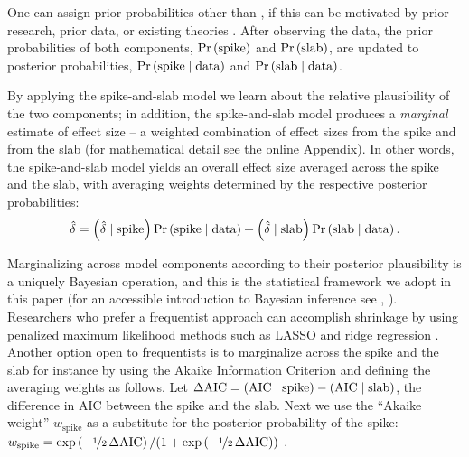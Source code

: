 \documentclass[a4paper]{article}
\newcommand{\shypo}[1]{%
	\ifnum#1>0%
		\mathrm{slab}
	\else%
		\mathrm{spike}
	\fi%
}
\newcommand{\data}{\mathrm{data}}%
\newcommand{\obsDelta}{\hat{\delta}}
\newcommand{\probo}{\mathrm{Pr}}
\newcommand{\prob}[1]{\probo\left(#1\right)}
\newcommand{\AIC}{\mathrm{AIC}}
\newcommand{\DeltaAIC}{\Delta\AIC}
\newenvironment{revision}{\color{teal}}{\color{black}}
\begin{document}
\begin{revision}%
One can assign prior probabilities other than , if this can be motivated by prior research, prior data, or existing theories \parencite[e.g., ][]{wilson2018prior}.
After observing the data, the prior probabilities of both components, $\prob{\shypo{0}}$ and $\prob{\shypo{1}}$, are updated to posterior probabilities, $\prob{\shypo{0}\mid\data}$ and $\prob{\shypo{1}\mid\data}$.

By applying the spike-and-slab model we learn about the relative plausibility of the two components; in addition, the spike-and-slab model produces a \emph{marginal} estimate of effect size -- a weighted combination of effect sizes from the spike and from the slab (for mathematical detail see the online Appendix). In other words, the spike-and-slab model yields an overall effect size averaged across the spike and the slab, with averaging weights determined by the respective posterior probabilities: 
\begin{align}
\label{eq:modelaverageddelta}
	\obsDelta = \left(\obsDelta\mid\shypo{0}\right)\prob{\shypo{0}\mid\data} + \left(\obsDelta\mid\shypo{1}\right)\prob{\shypo{1}\mid\data}.
\end{align}

Marginalizing across model components according to their posterior plausibility is a uniquely Bayesian operation, and this is the statistical framework we adopt in this paper (for an accessible introduction to Bayesian inference see \citeauthor{VandekerckhoveEtAl2018SI}, \citeyear{VandekerckhoveEtAl2018SI}). Researchers who prefer a frequentist approach can accomplish shrinkage by using penalized maximum likelihood methods such as LASSO and ridge regression \parencite{tibshirani2005sparsity}. Another option open to frequentists is to marginalize across the spike and the slab for instance by using the Akaike Information Criterion \parencite[AIC;][]{Akaike1973} and defining the averaging weights as follows. Let $\DeltaAIC = \left(\AIC\mid\shypo{0}\right) - \left(\AIC\mid\shypo{1}\right)$, the difference in AIC between the spike and the slab. Next we use the ``Akaike weight'' $w_{\text{spike}}$ as a substitute for the posterior probability of the spike: 
$w_{\shypo{0}} = \exp\left(-\nicefrac{1}{2}\,\DeltaAIC\right) / (1 + \exp\left(-\nicefrac{1}{2}\,\DeltaAIC\right))$ 
\parencite{WagenmakersFarrell2004, BurnhamAnderson2002}. 


\end{revision}
\end{document}
